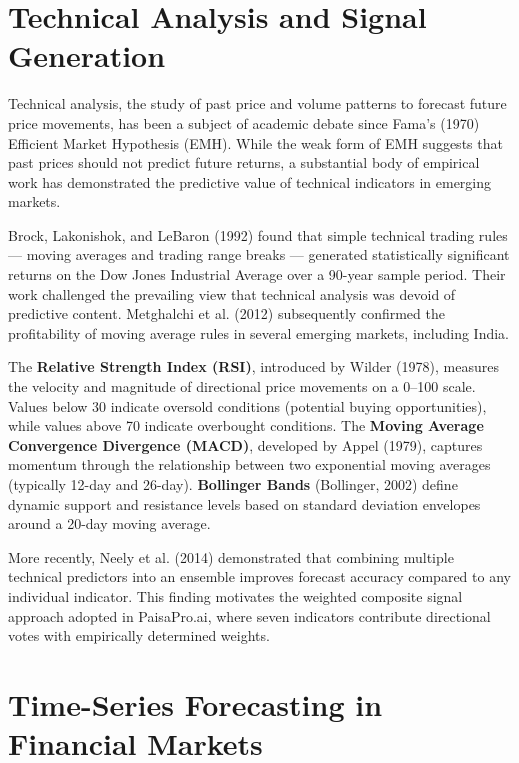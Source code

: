 \documentclass[12pt, a4paper, oneside]{report}
\newcommand{\projectname}{PaisaPro.ai}
\begin{document}
\section{Technical Analysis and Signal Generation}
\label{sec:lit_technical}

Technical analysis, the study of past price and volume patterns to forecast future price movements, has been a subject of academic debate since Fama's (1970) Efficient Market Hypothesis (EMH). While the weak form of EMH suggests that past prices should not predict future returns, a substantial body of empirical work has demonstrated the predictive value of technical indicators in emerging markets.

Brock, Lakonishok, and LeBaron (1992) found that simple technical trading rules --- moving averages and trading range breaks --- generated statistically significant returns on the Dow Jones Industrial Average over a 90-year sample period. Their work challenged the prevailing view that technical analysis was devoid of predictive content. Metghalchi et al. (2012) subsequently confirmed the profitability of moving average rules in several emerging markets, including India.

The \textbf{Relative Strength Index (RSI)}, introduced by Wilder (1978), measures the velocity and magnitude of directional price movements on a 0--100 scale. Values below 30 indicate oversold conditions (potential buying opportunities), while values above 70 indicate overbought conditions. The \textbf{Moving Average Convergence Divergence (MACD)}, developed by Appel (1979), captures momentum through the relationship between two exponential moving averages (typically 12-day and 26-day). \textbf{Bollinger Bands} (Bollinger, 2002) define dynamic support and resistance levels based on standard deviation envelopes around a 20-day moving average.

More recently, Neely et al. (2014) demonstrated that combining multiple technical predictors into an ensemble improves forecast accuracy compared to any individual indicator. This finding motivates the weighted composite signal approach adopted in \projectname{}, where seven indicators contribute directional votes with empirically determined weights.

\section{Time-Series Forecasting in Financial Markets}
\label{sec:lit_timeseries}
\end{document}

